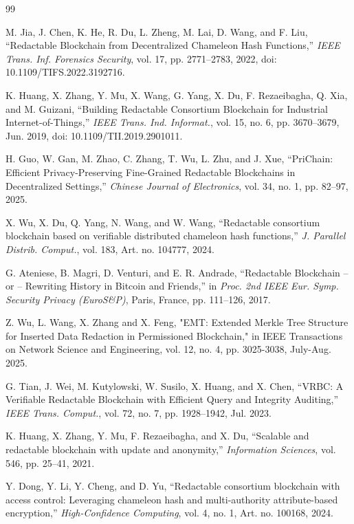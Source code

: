\documentclass[lettersize,journal]{IEEEtran}
\begin{document}
\begin{thebibliography}{99}

M. Jia, J. Chen, K. He, R. Du, L. Zheng, M. Lai, D. Wang, and F. Liu,
``Redactable Blockchain from Decentralized Chameleon Hash Functions,''
\textit{IEEE Trans. Inf. Forensics Security}, vol. 17, pp. 2771--2783, 2022,
doi: 10.1109/TIFS.2022.3192716.

K. Huang, X. Zhang, Y. Mu, X. Wang, G. Yang, X. Du, F. Rezaeibagha, Q. Xia, and M. Guizani,
``Building Redactable Consortium Blockchain for Industrial Internet-of-Things,''
\textit{IEEE Trans. Ind. Informat.}, vol. 15, no. 6, pp. 3670--3679, Jun. 2019,
doi: 10.1109/TII.2019.2901011.

H. Guo, W. Gan, M. Zhao, C. Zhang, T. Wu, L. Zhu, and J. Xue,
``PriChain: Efficient Privacy-Preserving Fine-Grained Redactable Blockchains in Decentralized Settings,''
\textit{Chinese Journal of Electronics}, vol. 34, no. 1, pp. 82--97, 2025.

X. Wu, X. Du, Q. Yang, N. Wang, and W. Wang,
``Redactable consortium blockchain based on verifiable distributed chameleon hash functions,''
\textit{J. Parallel Distrib. Comput.}, vol. 183, Art. no. 104777, 2024.

G. Ateniese, B. Magri, D. Venturi, and E. R. Andrade,
``Redactable Blockchain -- or -- Rewriting History in Bitcoin and Friends,''
in \textit{Proc. 2nd IEEE Eur. Symp. Security Privacy (EuroS\&P)},
Paris, France, pp. 111--126, 2017.

Z. Wu, L. Wang, X. Zhang and X. Feng, "EMT: Extended Merkle Tree Structure for Inserted Data Redaction in Permissioned Blockchain," in IEEE Transactions on Network Science and Engineering, vol. 12, no. 4, pp. 3025-3038, July-Aug. 2025.

G. Tian, J. Wei, M. Kutylowski, W. Susilo, X. Huang, and X. Chen,
``VRBC: A Verifiable Redactable Blockchain with Efficient Query and Integrity Auditing,''
\textit{IEEE Trans. Comput.}, vol. 72, no. 7, pp. 1928--1942, Jul. 2023.

K. Huang, X. Zhang, Y. Mu, F. Rezaeibagha, and X. Du,
``Scalable and redactable blockchain with update and anonymity,''
\textit{Information Sciences}, vol. 546, pp. 25--41, 2021.

Y. Dong, Y. Li, Y. Cheng, and D. Yu,
``Redactable consortium blockchain with access control: Leveraging chameleon hash and multi-authority attribute-based encryption,''
\textit{High-Confidence Computing}, vol. 4, no. 1, Art. no. 100168, 2024.


\end{thebibliography}
\end{document}
